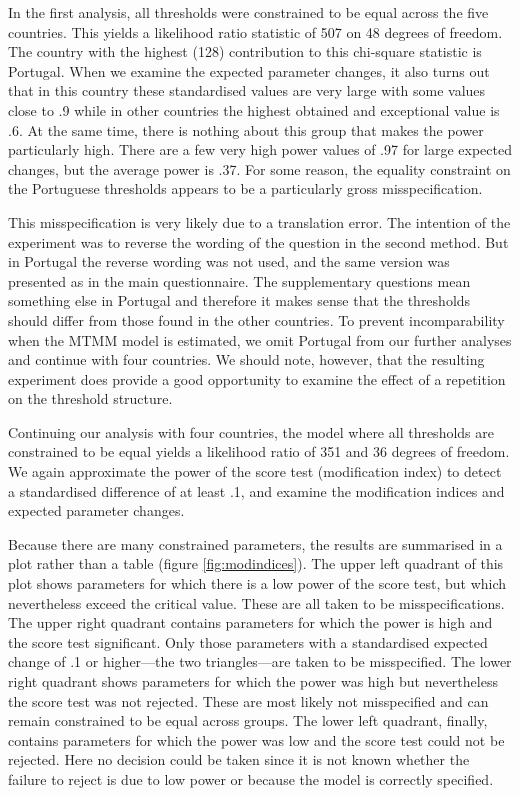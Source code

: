 \documentclass[a4paper,12pt]{article}
\begin{document}
In the first analysis, all thresholds were constrained to be equal across the five countries. This yields a likelihood ratio statistic of 507 on 48 degrees of freedom. The country with the highest (128) contribution to this chi-square statistic is Portugal. When we examine the expected parameter changes, it also turns out that in this country these standardised values are very large with some values close to .9 while in other countries the highest obtained and exceptional value is .6. At the same time, there is nothing about this group that makes the power particularly high. There are a few very high power values of .97 for large expected changes, but the average power is .37. For some reason, the equality constraint on the Portuguese thresholds appears to be a particularly gross misspecification.

This misspecification is very likely due to a translation error. The intention of the experiment was to reverse the wording of the question in the second method. But in Portugal the reverse wording was not used, and the same version was presented as in the main questionnaire. The supplementary questions mean something else in Portugal and therefore it makes sense that the thresholds should differ from those found in the other countries. To prevent incomparability when the MTMM model is estimated, we omit Portugal from our further analyses and continue with four countries. We should note, however, that the resulting experiment does provide a good opportunity to examine the effect of a repetition on the threshold structure.

Continuing our analysis with four countries, the model where all thresholds are constrained to be equal yields a likelihood ratio of 351 and 36 degrees of freedom. We again approximate the power of the score test (modification index) to detect a standardised difference of at least .1, and examine the modification indices and expected parameter changes. 

Because there are many constrained parameters, the results are summarised in a plot rather than a table (figure \ref{fig:modindices}). The upper left quadrant of this plot shows parameters for which there is a low power of the score test, but which nevertheless exceed the critical value. These are all taken to be misspecifications. The upper right quadrant contains parameters for which the power is high and the score test significant. Only those parameters with a standardised expected change of .1 or higher—the two triangles—are taken to be misspecified. The lower right quadrant shows parameters for which the power was high but nevertheless the score test was not rejected. These are most likely not misspecified and can remain constrained to be equal across groups. The lower left quadrant, finally, contains parameters for which the power was low and the score test could not be rejected. Here no decision could be taken since it is not known whether the failure to reject is due to low power or because the model is correctly specified.
\end{document}
